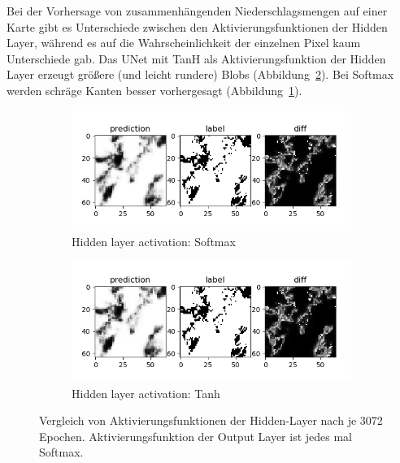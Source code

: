 Bei der Vorhersage von zusammenhängenden Niederschlagsmengen auf einer Karte gibt es Unterschiede zwischen den Aktivierungsfunktionen der Hidden Layer, während es auf die Wahrscheinlichkeit der einzelnen Pixel kaum Unterschiede gab.
Das UNet mit TanH als Aktivierungsfunktion der Hidden Layer erzeugt größere (und leicht rundere) Blobs (Abbildung~\ref{fig:hiddenActivationTanh}). Bei Softmax werden schräge Kanten besser vorhergesagt (Abbildung~\ref{fig:hiddenActivationSoftmax}).
\begin{figure}[ht]
\centering
\begin{subfigure}{0.5\textwidth}
\centering
\includegraphics[width=\linewidth]{pics/categorical_crossentropy_hidden-softmax_output-softmax_above_3072}
\caption{Hidden layer activation: Softmax}
\label{fig:hiddenActivationSoftmax}
\end{subfigure}%
\begin{subfigure}{0.5\textwidth}
\centering
\includegraphics[width=\linewidth]{pics/categorical_crossentropy_hidden-tanh_output-softmax_above_3072}
\caption{Hidden layer activation: Tanh}
\label{fig:hiddenActivationTanh}
\end{subfigure}%
\caption[Vergleich von Aktivierungsfunktionen der Hidden-Layer]{Vergleich von Aktivierungsfunktionen der Hidden-Layer nach je 3072 Epochen. Aktivierungsfunktion der Output Layer ist jedes mal Softmax.}
\label{fig:activatinHidden}
\end{figure}


